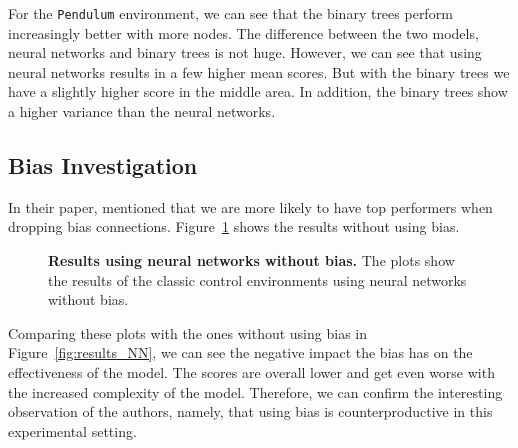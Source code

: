 For the \verb|Pendulum| environment, we can see that the binary trees perform increasingly better with more nodes. The difference between the two models, neural networks and binary trees is not huge. However, we can see that using neural networks results in a few higher mean scores. But with the binary trees we have a slightly higher score in the middle area. In addition, the binary trees show a higher variance than the neural networks.

\subsection{Bias Investigation}
In their paper, \cite{oller_analyzing_2020} mentioned that we are more likely to have top performers when dropping bias connections. Figure~\ref{fig:results_NN_bias} shows the results without using bias.
\begin{figure}[!ht]
\begin{figrow}
\item \label{row:NN_with_bias_CartPole} 
\item \label{row:NN_with_bias_Pendulum} 
\item \label{row:NN_with_bias_Pendulum} 
\end{figrow}
\caption[Results using neural networks without bias]{
  \textbf{Results using neural networks without bias.}
   The plots show the results of the classic control environments using neural networks without bias.
}
\label{fig:results_NN_bias}
\end{figure}
Comparing these plots with the ones without using bias in Figure~\ref{fig:results_NN}, we can see the negative impact the bias has on the effectiveness of the model. The scores are overall lower and get even worse with the increased complexity of the model. Therefore, we can confirm the interesting observation of the authors, namely, that using bias is counterproductive in this experimental setting.

